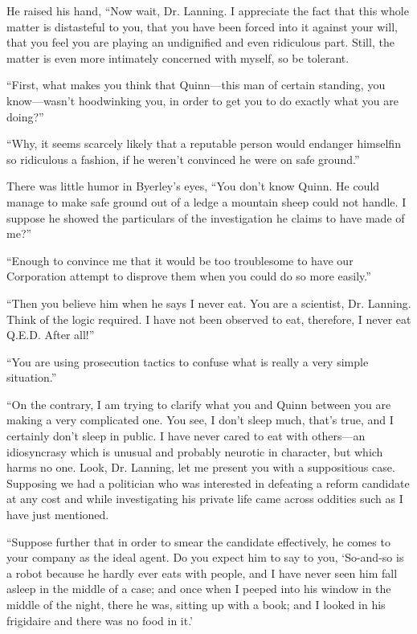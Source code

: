 \documentclass[10pt,a5paper,twoside]{book}
\begin{document}
He raised his hand, “Now wait, Dr. Lanning. I appreciate the fact that this whole matter is distasteful to you, that you have been forced into it against your will, that you feel you are playing an undignified and even ridiculous part. Still, the matter is even more intimately concerned with myself, so be tolerant.

“First, what makes you think that Quinn—this man of certain standing, you know—wasn’t hoodwinking you, in order to get you to do exactly what you are doing?”

“Why, it seems scarcely likely that a reputable person would endanger himselfin so ridiculous a fashion, if he weren’t convinced he were on safe ground.”

There was little humor in Byerley’s eyes, “You don’t know Quinn. He could manage to make safe ground out of a ledge a mountain sheep could not handle. I suppose he showed the particulars of the investigation he claims to have made of me?”

“Enough to convince me that it would be too troublesome to have our Corporation attempt to disprove them when you could do so more easily.”

“Then you believe him when he says I never eat. You are a scientist, Dr. Lanning. Think of the logic required. I have not been observed to eat, therefore, I never eat Q.E.D. After all!”

“You are using prosecution tactics to confuse what is really a very simple situation.”

“On the contrary, I am trying to clarify what you and Quinn between you are making a very complicated one. You see, I don’t sleep much, that’s true, and I certainly don’t sleep in public. I have never cared to eat with others—an idiosyncrasy which is unusual and probably neurotic in character, but which harms no one. Look, Dr. Lanning, let me present you with a suppositious case. Supposing we had a politician who was interested in defeating a reform candidate at any cost and while investigating his private life came across oddities such as I have just mentioned.

“Suppose further that in order to smear the candidate effectively, he comes to your company as the ideal agent. Do you expect him to say to you, ‘So-and-so is a robot because he hardly ever eats with people, and I have never seen him fall asleep in the middle of a case; and once when I peeped into his window in the middle of the night, there he was, sitting up with a book; and I looked in his frigidaire and there was no food in it.’
\end{document}
